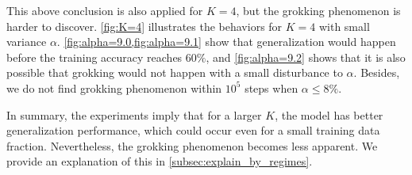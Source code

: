 This above conclusion is also applied for $K=4$, but the grokking phenomenon is harder to discover. \cref{fig:K=4} illustrates the behaviors for $K=4$ with small variance $\alpha$. \cref{fig:alpha=9.0,fig:alpha=9.1} show that
generalization would happen before the training accuracy reaches $60\%$, and \cref{fig:alpha=9.2} shows that it is also possible that grokking would not happen with a small disturbance to $\alpha$. Besides, we do not find grokking phenomenon within $10^5$ steps when $\alpha\leq 8\%$.

In summary, the experiments imply that for a larger $K$, the model has better generalization performance, which could occur even for a small training data fraction.
Nevertheless, the grokking phenomenon becomes less apparent.
We provide an explanation of this in \cref{subsec:explain_by_regimes}.

